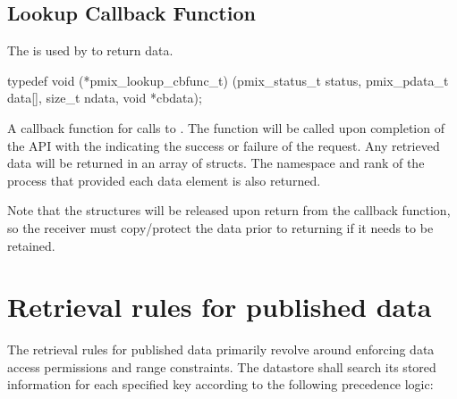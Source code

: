 \subsection{Lookup Callback Function}

\summary

The  is used by  to return data.

\cspecificstart
\begin{codepar}
typedef void (*pmix_lookup_cbfunc_t)
    (pmix_status_t status,
     pmix_pdata_t data[], size_t ndata,
     void *cbdata);
\end{codepar}
\cspecificend

\begin{arglist}
\end{arglist}


\descr

A callback function for calls to .
The function will be called upon completion of the  \ac{API} with the  indicating the success or failure of the request.
Any retrieved data will be returned in an array of  structs.
The namespace and rank of the process that provided each data element is also returned.

Note that the  structures will be released upon return from the callback function, so the receiver must copy/protect the data prior to returning if it needs to be retained.


\section{Retrieval rules for published data}
\label{chap:pub:retrules}

The retrieval rules for published data primarily revolve around enforcing data access permissions and range constraints. The datastore shall search its stored information for each specified key according to the following precedence logic:

